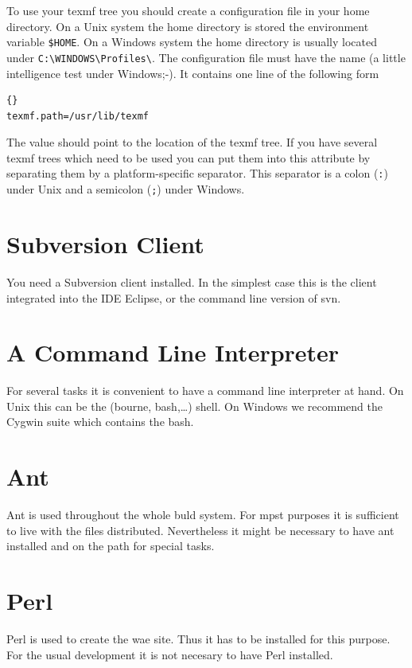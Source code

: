 To use your texmf tree you should create a configuration file in your
home directory. On a Unix system the home directory is stored the
environment variable \verb|$HOME|. On a Windows system the home
directory is usually located under \verb|C:\WINDOWS\Profiles\|.  The
configuration file must have the name  (a little
intelligence test under Windows;-). It contains one line of the
following form

\begin{lstlisting}{}
texmf.path=/usr/lib/texmf
\end{lstlisting}

The value should point to the location of the texmf tree. If you have
several texmf trees which need to be used you can put them into this
attribute by separating them by a platform-specific separator. This
separator is a colon (\verb|:|) under Unix and a semicolon (\verb|;|)
under Windows.


\section{Subversion Client}

You need a Subversion client installed. In the simplest case this is the
client integrated into the IDE Eclipse, or the command line version of svn.


\section{A Command Line Interpreter}

For several tasks it is convenient to have a command line interpreter
at hand. On Unix this can be the (bourne, bash,\ldots) shell. On Windows
we recommend the Cygwin suite which contains the bash.


\section{Ant}

Ant is used throughout the whole buld system. For mpst purposes it is
sufficient to live with the files distributed. Nevertheless it might be
necessary to have ant installed and on the path for special tasks.


\section{Perl}

Perl is used to create the wae site. Thus it has to be installed for this
purpose. For the usual development it is not necesary to have Perl installed.


